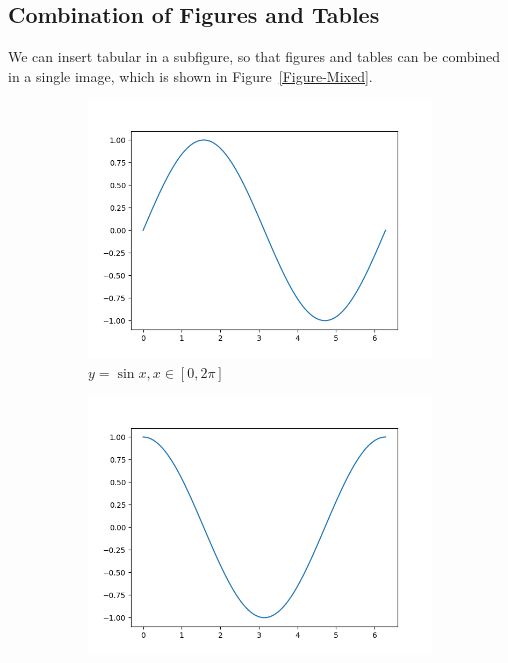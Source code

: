 \subsection{Combination of Figures and Tables}
We can insert tabular in a subfigure, so that figures and tables can be combined in a single image, which is shown in Figure~\ref{Figure-Mixed}.
\begin{figure}
    \centering
    \begin{subfigure}{0.3\linewidth}
        \includegraphics[width=\linewidth]{../figures/sin.png}
        \caption{\(y=\sin x, x\in[0,2\pi]\)}
    \end{subfigure}
    \begin{subfigure}{0.3\linewidth}
        \includegraphics[width=\linewidth]{../figures/cos.png}

\end{subfigure}
\end{figure}

